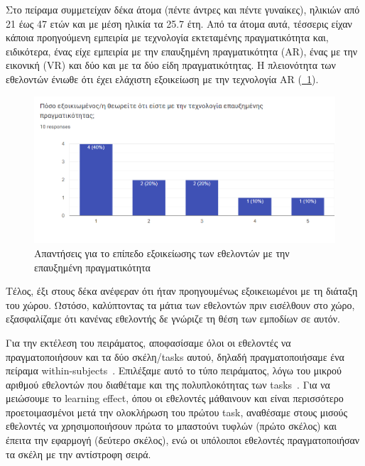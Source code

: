 Στο πείραμα συμμετείχαν δέκα άτομα (πέντε άντρες και πέντε γυναίκες), ηλικιών από 21 έως 47 ετών και με μέση ηλικία τα 25.7 έτη. Από τα άτομα αυτά, τέσσερις είχαν κάποια προηγούμενη εμπειρία με τεχνολογία εκτεταμένης πραγματικότητα και, ειδικότερα, ένας είχε εμπειρία με την επαυξημένη πραγματικότητα (AR), ένας με την εικονική (VR) και δύο και με τα δύο είδη πραγματικότητας. Η πλειονότητα των εθελοντών ένιωθε ότι έχει ελάχιστη εξοικείωση με την τεχνολογία AR (\hyperref[fig:questARFamiliariaty]{\schema~\ref*{fig:questARFamiliariaty}}).

\begin{figure}[!h]
    \centering
    \includegraphics[width=1\textwidth]{images/questionnaire_familiarityAR.png}
    \caption{Απαντήσεις για το επίπεδο εξοικείωσης των εθελοντών με την επαυξημένη πραγματικότητα}\label{fig:questARFamiliariaty}
\end{figure}

Τέλος, έξι στους δέκα ανέφεραν ότι ήταν προηγουμένως εξοικειωμένοι με τη διάταξη του χώρου. Ωστόσο, καλύπτοντας τα μάτια των εθελοντών πριν εισέλθουν στο χώρο, εξασφαλίζαμε ότι κανένας εθελοντής δε γνώριζε τη θέση των εμποδίων σε αυτόν.

Για την εκτέλεση του πειράματος, αποφασίσαμε όλοι οι εθελοντές να πραγματοποιήσουν και τα δύο σκέλη/tasks αυτού, δηλαδή πραγματοποιήσαμε ένα πείραμα within-subjects~\cite{bhandari_2021_withinsubjects}. Επιλέξαμε αυτό το τύπο πειράματος, λόγω του μικρού αριθμού εθελοντών που διαθέταμε και της πολυπλοκότητας των tasks~\cite{lazar_2017_research}. Για να μειώσουμε το learning effect, όπου οι εθελοντές μάθαινουν και είναι περισσότερο προετοιμασμένοι μετά την ολοκλήρωση του πρώτου task, αναθέσαμε στους μισούς εθελοντές να χρησιμοποιήσουν πρώτα το μπαστούνι τυφλών (πρώτο σκέλος) και έπειτα την εφαρμογή (δεύτερο σκέλος), ενώ οι υπόλοιποι εθελοντές πραγματοποιήσαν τα σκέλη με την αντίστροφη σειρά.

